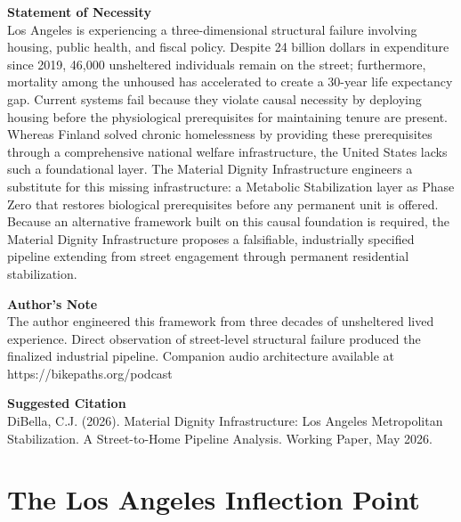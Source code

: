 \documentclass[12pt, letterpaper]{article}
\begin{document}
{\vspace{8pt}
\noindent\textbf{Statement of Necessity}\\[1pt]
Los Angeles is experiencing a three-dimensional structural failure involving housing, public health, and fiscal policy. Despite 24 billion dollars in expenditure since 2019, 46,000 unsheltered individuals remain on the street; furthermore, mortality among the unhoused has accelerated to create a 30-year life expectancy gap. Current systems fail because they violate causal necessity by deploying housing before the physiological prerequisites for maintaining tenure are present. Whereas Finland solved chronic homelessness by providing these prerequisites through a comprehensive national welfare infrastructure, the United States lacks such a foundational layer. The Material Dignity Infrastructure engineers a substitute for this missing infrastructure: a Metabolic Stabilization layer as Phase Zero that restores biological prerequisites before any permanent unit is offered. Because an alternative framework built on this causal foundation is required, the Material Dignity Infrastructure proposes a falsifiable, industrially specified pipeline extending from street engagement through permanent residential stabilization.

\vspace{8pt}
\noindent\textbf{Author's Note}\\[1pt]
The author engineered this framework from three decades of unsheltered lived experience. Direct observation of street-level structural failure produced the finalized industrial pipeline. Companion audio architecture available at https://bikepaths.org/podcast

\vspace{8pt}
\noindent\textbf{Suggested Citation}\\[1pt]
DiBella, C.J. (2026). Material Dignity Infrastructure: Los Angeles Metropolitan Stabilization. A Street-to-Home Pipeline Analysis. Working Paper, May 2026.

}

\newpage
\begingroup
{}
\setlength{\cftbeforesecskip}{2pt}
\setlength{\cftbeforesubsecskip}{-2pt}
\tableofcontents
\endgroup

\newpage
{}

\clearpage
\section{The Los Angeles Inflection Point}
\end{document}
